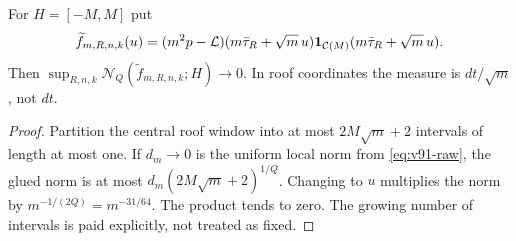 \begin{corollary}
\label{cor:v91-diffusive}
For $H=[-M,M]$ put
\[
 \widetilde f_{m,R,n,k}(u)=
 (m^2p-\mathcal L)(m\bar\tau_R+\sqrt m\,u)
 \mathbf1_{\mathcal C(M)}(m\bar\tau_R+\sqrt m\,u).
\]
Then $\sup_{R,n,k}\mathcal N_Q(\widetilde f_{m,R,n,k};H)\to0$.
In roof coordinates the measure is $dt/\sqrt m$, not $dt$.
\end{corollary}
\begin{proof}
Partition the central roof window into at most $2M\sqrt m+2$
intervals of length at most one. If $d_m\to0$ is the uniform
local norm from \eqref{eq:v91-raw}, the glued norm is at most
$d_m(2M\sqrt m+2)^{1/Q}$. Changing to $u$ multiplies the norm
by $m^{-1/(2Q)}=m^{-31/64}$. The product tends to zero. The
growing number of intervals is paid explicitly, not treated as fixed.
\end{proof}
